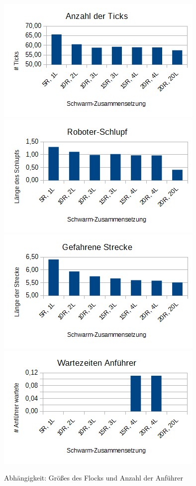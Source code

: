 \begin{figure}[h]
	\includegraphics[width=\sectionTransportPictureWidth , height=\sectionTransportPictureHeight]{graphics/Statistics/Transport/Number_Observations.png}
	\includegraphics[width=\sectionTransportPictureWidth , height=\sectionTransportPictureHeight]{graphics/Statistics/Transport/Number_Slack.png}
	\includegraphics[width=\sectionTransportPictureWidth , height=\sectionTransportPictureHeight]{graphics/Statistics/Transport/Number_Way.png}
	\includegraphics[width=\sectionTransportPictureWidth , height=\sectionTransportPictureHeight]{graphics/Statistics/Transport/Number_Move.png}
	\caption{Abhängigkeit: Größes des Flocks und Anzahl der Anführer}
	\label{pic:TransportNumber}
\end{figure}

